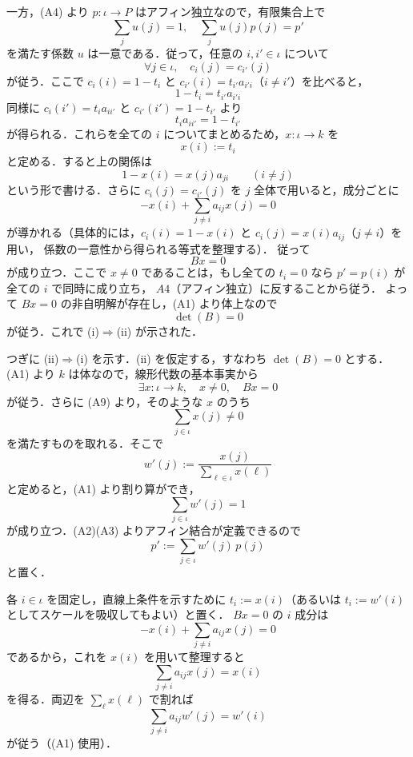 \documentclass[a4paper,12pt]{bxjsbook}
\makeatletter
\newlength{\customindent}
\newenvironment{body}{
  \par
  \begingroup
  \setlength{\leftskip}{\customindent}
  \setlength{\rightskip}{0pt}
  \setlength{\parindent}{1em}
  \setlength{\displayindent}{\customindent}
  \setlength{\displaywidth}{\dimexpr\linewidth-\customindent\relax}
}{
  \par
  \endgroup
}
\theoremstyle{theorem}
\renewenvironment{proof}[1][\proofname]{%
  \par\pushQED{\qed}%
  \normalfont
  \topsep6\p@\@plus6\p@\relax
  \list{}{%
    \leftmargin=\customindent
    \rightmargin=0pt
    \labelwidth=0pt
    \labelsep=0pt
    \itemindent=0pt
    \listparindent=0pt
    \parsep=0pt
  }%
  \item[\itshape #1\@addpunct{.}\hspace{0.5em}]%
  \setlength{\displayindent}{\customindent}%
  \setlength{\displaywidth}{\dimexpr\linewidth-\customindent\relax}%
  \ignorespaces
}{%
  \popQED\endlist\@endpefalse
}
\makeatother
\begin{document}
\begin{body}
\begin{proof}
        一方，(A4) より $p:\iota\to P$ はアフィン独立なので，有限集合上で
        \[
        \sum_{j}u(j)=1,\quad \sum_{j}u(j)p(j)=p'
        \]
        を満たす係数 $u$ は一意である．従って，任意の $i,i'\in\iota$ について
        \[
        \forall j\in\iota,\quad c_i(j)=c_{i'}(j)
        \]
        が従う．ここで $c_i(i)=1-t_i$ と $c_{i'}(i)=t_{i'}a_{i'i}$（$i\neq i'$）を比べると，
        \[
        1-t_i=t_{i'}a_{i'i}
        \]
        同様に $c_i(i')=t_i a_{ii'}$ と $c_{i'}(i')=1-t_{i'}$ より
        \[
        t_i a_{ii'}=1-t_{i'}
        \]
        が得られる．これらを全ての $i$ についてまとめるため，$x:\iota\to k$ を
        \[
        x(i):=t_i
        \]
        と定める．すると上の関係は
        \[
        1-x(i)=x(j)a_{ji}\qquad (i\neq j)
        \]
        という形で書ける．さらに $c_i(j)=c_{i'}(j)$ を $j$ 全体で用いると，成分ごとに
        \[
        -x(i)+\sum_{j\neq i}a_{ij}x(j)=0
        \]
        が導かれる（具体的には，$c_i(i)=1-x(i)$ と $c_i(j)=x(i)a_{ij}$（$j\neq i$）を用い，
        係数の一意性から得られる等式を整理する）．
        従って
        \[
        Bx=0
        \]
        が成り立つ．ここで $x\neq 0$ であることは，もし全ての $t_i=0$ なら $p'=p(i)$ が全ての $i$ で同時に成り立ち，
        $A4$（アフィン独立）に反することから従う．
        よって $Bx=0$ の非自明解が存在し，(A1) より体上なので
        \[
        \det(B)=0
        \]
        が従う．これで (i)$\Rightarrow$(ii) が示された．

        つぎに (ii)$\Rightarrow$(i) を示す．(ii) を仮定する，すなわち $\det(B)=0$ とする．
        (A1) より $k$ は体なので，線形代数の基本事実から
        \[
        \exists x:\iota\to k,\quad x\neq 0,\quad Bx=0
        \]
        が従う．さらに (A9) より，そのような $x$ のうち
        \[
        \sum_{j\in\iota}x(j)\neq 0
        \]
        を満たすものを取れる．そこで
        \[
        w'(j):=\frac{x(j)}{\sum_{\ell\in\iota}x(\ell)}
        \]
        と定めると，(A1) より割り算ができ，
        \[
        \sum_{j\in\iota}w'(j)=1
        \]
        が成り立つ．(A2)(A3) よりアフィン結合が定義できるので
        \[
        p':=\sum_{j\in\iota} w'(j)\,p(j)
        \]
        と置く．

        各 $i\in\iota$ を固定し，直線上条件を示すために $t_i:=x(i)$（あるいは $t_i:=w'(i)$ としてスケールを吸収してもよい）と置く．
        $Bx=0$ の $i$ 成分は
        \[
        -x(i)+\sum_{j\neq i}a_{ij}x(j)=0
        \]
        であるから，これを $x(i)$ を用いて整理すると
        \[
        \sum_{j\neq i}a_{ij}x(j)=x(i)
        \]
        を得る．両辺を $\sum_{\ell}x(\ell)$ で割れば
        \[
        \sum_{j\neq i}a_{ij}w'(j)=w'(i)
        \]
        が従う（(A1) 使用）．


\end{proof}
\end{body}
\end{document}

